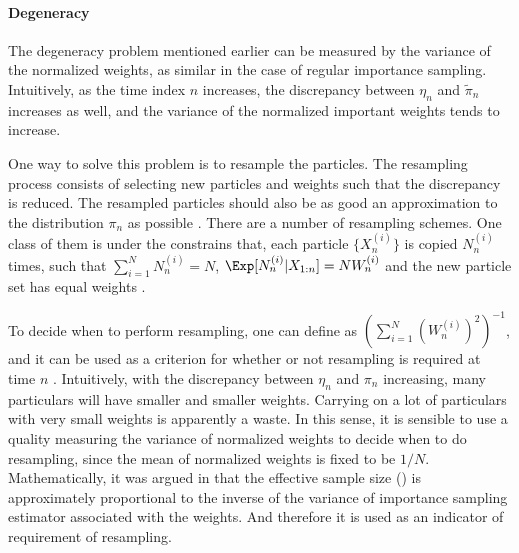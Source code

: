 \paragraph{Degeneracy} The degeneracy problem mentioned earlier can be
measured by the variance of the normalized weights, as similar in the case
of regular importance sampling. Intuitively, as the time index $n$
increases, the discrepancy between $\eta_n$ and $\tilde{\pi}_n$ increases as
well, and the variance of the normalized important weights tends to
increase.

One way to solve this problem is to resample the particles. The resampling
process consists of selecting new particles and weights such that the
discrepancy is reduced. The resampled particles should also be as good an
approximation to the distribution $\pi_n$ as possible \parencite{Douc2005}.
There are a number of resampling schemes. One class of them is under the
constrains that, each particle $\{X_n^{(i)}\}$ is copied $N_n^{(i)}$ times,
such that $\sum_{i=1}^N N_n^{(i)} = N$, $\Exp[N_n^{(i)}|X_{1:n}] =
NW_n^{(i)}$ and the new particle set has equal weights
\parencite{Douc2005,DelMoral2006}.

To decide when to perform resampling, one can define \ess as
$(\sum_{i=1}^N(W_n^{(i)})^2)^{-1}$, and it can be used as a criterion for
whether or not resampling is required at time $n$ \parencite{Liu1998}.
Intuitively, with the discrepancy between $\eta_n$ and $\pi_n$ increasing,
many particulars will have smaller and smaller weights. Carrying on a lot of
particulars with very small weights is apparently a waste. In this sense, it
is sensible to use a quality measuring the variance of normalized weights to
decide when to do resampling, since the mean of normalized weights is fixed to
be $1/N$. Mathematically, it was argued in \textcite{Liu1998} that the
effective sample size (\ess) is approximately proportional to the inverse of
the variance of importance sampling estimator associated with the weights. And
therefore it is used as an indicator of requirement of resampling.

